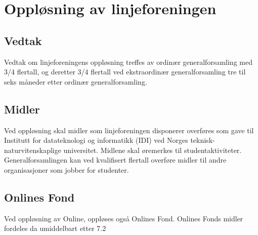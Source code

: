 \chapter{Oppløsning av linjeforeningen}
\section{Vedtak}
\vspace{23pt}

Vedtak om linjeforeningens oppløsning treffes av ordinær generalforsamling med 3/4 flertall, og deretter 3/4 flertall ved ekstraordinær generalforsamling tre til seks måneder etter ordinær generalforsamling.

\section{Midler}
\vspace{23pt}

Ved oppløsning skal midler som linjeforeningen disponerer overføres som gave til \mbox{Institutt} for datateknologi og informatikk (IDI) ved Norges teknisk-\linebreak naturvitenskaplige universitet. Midlene skal øremerkes til studentaktiviteter. Generalforsamlingen kan ved kvalifisert flertall overføre midler til andre organisasjoner som jobber for studenter.

\section{Onlines Fond}
\vspace{23pt}

Ved oppløsning av Online, oppløses også Onlines Fond. Onlines Fonds midler fordeles da umiddelbart etter 7.2
